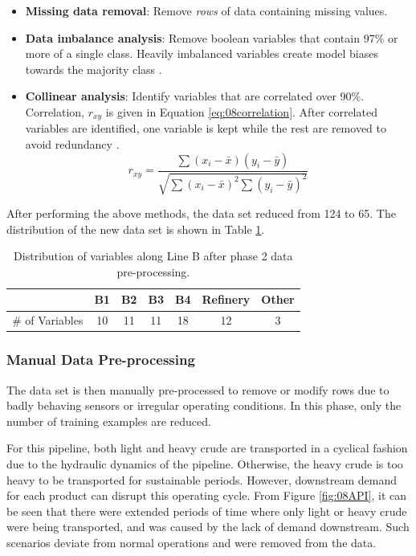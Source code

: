 \begin{itemize}
    \item \textbf{Missing data removal}: Remove \textit{rows} of data containing missing values.
    \item \textbf{Data imbalance analysis}: Remove boolean variables that contain 97\% or more of a single class.  Heavily imbalanced variables create model biases towards the majority class \cite{data_preprocessing}.
    \item \textbf{Collinear analysis}: Identify variables that are correlated over 90\%. Correlation, $r_{xy}$ is given in Equation \ref{eq:08correlation}. After correlated variables are identified, one variable is kept while the rest are removed to avoid redundancy \cite{data_preprocessing}.
    \begin{equation}
        r_{xy} = \frac{\sum(x_i - \bar{x})(y_i - \bar{y})}{\sqrt{\sum(x_i - \bar{x})^2\sum(y_i-\bar{y})^2}}
        \label{eq:08correlation}
    \end{equation}
    
\end{itemize}

After performing the above methods, the data set reduced from 124 to 65. The distribution of the new data set is shown in Table \ref{tab:08Ph2Data}.
\begin{table}[h]
    \centering
    {
    \begin{tabular}{ c | c | c | c | c | c | c}
             &  B1 & B2 & B3 & B4 & Refinery & Other      \\
        \hline
        \# of Variables  &  10  &  11  &  11  &  18  &  12  &  3  \\
    \end{tabular}}
    \caption{Distribution of variables along Line B after phase 2 data pre-processing.}
    \label{tab:08Ph2Data}
\end{table}

\subsubsection{Manual Data Pre-processing}
The data set is then manually pre-processed to remove or modify rows due to badly behaving sensors or irregular operating conditions.  In this phase, only the number of training examples are reduced.

For this pipeline, both light and heavy crude are transported in a cyclical fashion due to the hydraulic dynamics of the pipeline. Otherwise, the heavy crude is too heavy to be transported for sustainable periods. However, downstream demand for each product can disrupt this operating cycle.  From Figure \ref{fig:08API}, it can be seen that there were extended periods of time where only light or heavy crude were being transported, and was caused by the lack of demand downstream.  Such scenarios deviate from normal operations and were removed from the data.

